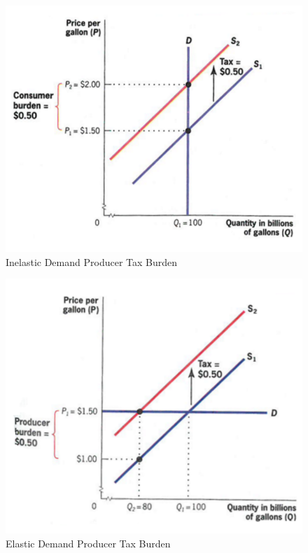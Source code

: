 \documentclass{article}
\begin{document}
\begin{figure}[H]
    \centering
    \includegraphics[scale=0.50]{"Inelastic Demand Producer Tax Burden"}
    \caption{Inelastic Demand Producer Tax Burden}
\end{figure}

\begin{figure}[H]
    \centering
    \includegraphics[scale=0.50]{"Elastic Demand Producer Tax Burden"}
    \caption{Elastic Demand Producer Tax Burden}
\end{figure}
\end{document}
